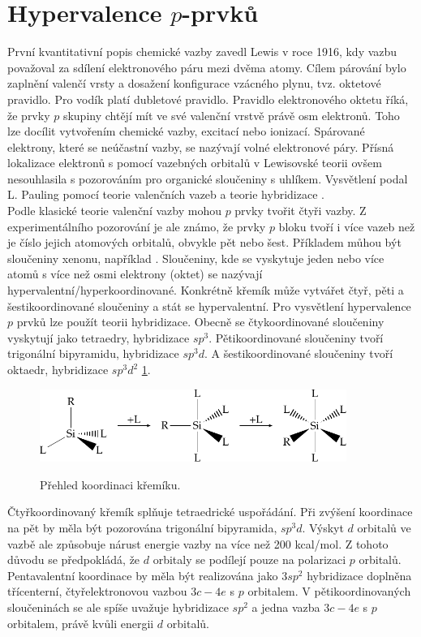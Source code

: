 \documentclass[
  digital, %
  table,   %
  lof,     %
  lot,     %
  oneside,
]{fithesis3}
\begin{document}
\section{Hypervalence $p$-prvků}
První kvantitativní popis chemické vazby zavedl Lewis v roce 1916, kdy vazbu považoval za sdílení elektronového páru mezi dvěma atomy. Cílem párování bylo zaplnění valenčí vrsty a dosažení konfigurace vzácného plynu, tvz. oktetové pravidlo. Pro vodík platí dubletové pravidlo. Pravidlo elektronového oktetu říká, že  prvky $p$ skupiny chtějí mít ve své valenční vrstvě právě osm elektronů. Toho lze docílit vytvořením chemické vazby, excitací nebo ionizací. Spárované elektrony, které se neúčastní vazby, se nazývají volné elektronové páry. Přísná lokalizace elektronů s pomocí vazebných orbitalů v Lewisovské teorii ovšem nesouhlasila s pozorováním pro organické sloučeniny s uhlíkem. Vysvětlení podal L. Pauling pomocí teorie valenčních vazeb a teorie hybridizace \cite{Munzarova1996thesis}.\\

Podle klasické teorie valenční vazby mohou $p$ prvky tvořit čtyři vazby. Z experimentálního pozorování je ale známo, že prvky $p$ bloku tvoří i více vazeb než je číslo jejich atomových orbitalů, obvykle pět nebo šest. Příkladem můhou být sloučeniny xenonu, například .
Sloučeniny, kde se vyskytuje jeden nebo více atomů s více než osmi elektrony (oktet) se nazývají hypervalentní/hyperkoordinované. Konkrétně křemík může vytvářet čtyř, pěti a šestikoordinované sloučeniny a stát se hypervalentní. Pro vysvětlení hypervalence $p$ prvků lze použít teorii hybridizace. Obecně se čtykoordinované sloučeniny vyskytují jako tetraedry, hybridizace $sp^3$. Pětikoordinované sloučeniny tvoří trigonální bipyramidu, hybridizace $sp^3d$. A šestikoordinované sloučeniny tvoří oktaedr, hybridizace $sp^3d^2$ \ref{prehled_koordinaci}.

\begin{figure}
\caption{Přehled koordinaci křemíku.}
\center \includegraphics[width=10cm]{drawing.pdf} \label{prehled_koordinaci} \end{figure}

Čtyřkoordinovaný křemík splňuje tetraedrické uspořádání. Při zvýšení koordinace na pět by měla být pozorována trigonální bipyramida, $sp^3d$. Výskyt $d$ orbitalů ve vazbě ale způsobuje nárust energie vazby na více než 200 kcal/mol. Z tohoto důvodu se předpokládá, že $d$ orbitaly se podílejí pouze na polarizaci $p$ orbitalů. Pentavalentní koordinace by měla být realizována jako $3sp^2$ hybridizace doplněna třícenterní, čtyřelektronovou vazbou $3c-4e$ s $p$ orbitalem. V pětikoordinovaných sloučeninách se ale spíše uvažuje hybridizace $sp^2$ a jedna vazba $3c-4e$ s $p$ orbitalem, právě kvůli energii $d$ orbitalů.
\end{document}
